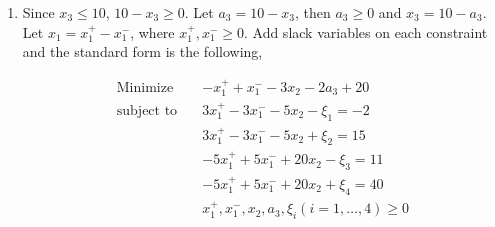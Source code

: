 \documentclass[12pt]{article}
\begin{document}
\begin{enumerate}
\item

Since $x_3 \leqslant 10$, $10 - x_3 \geqslant 0$. Let $a_3 = 10 - x_3$, then $a_3 \geqslant 0$ and $x_3 = 10 - a_3$.
Let $x_1 = x_1^+ - x_1^-$, where $x_1^+, x_1^- \geqslant 0$. Add slack variables on each constraint and the standard form is the following,

\begin{equation*}
\begin{aligned}
\text{Minimize} \quad & -x_1^+ + x_1^- - 3x_2 - 2a_3 + 20 \\
\text{subject\  to} \quad & 3x_1^+ - 3x_1^- - 5x_2 - \xi_1 = -2 \\
& 3x_1^+ - 3x_1^- - 5x_2 + \xi_2 = 15\\
& -5x_1^+ + 5x_1^- + 20x_2 - \xi_3 = 11 \\
& -5x_1^+ + 5x_1^- + 20x_2 + \xi_4 = 40 \\
& x_1^+, x_1^-, x_2, a_3, \xi_i (i = 1,\dots, 4)  \geqslant 0
\end{aligned}
\end{equation*}

\end{enumerate}
\end{document}
